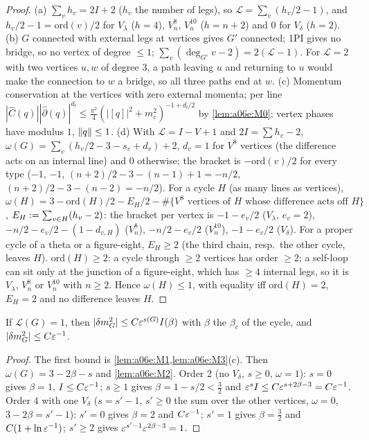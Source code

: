 \begin{proof}
(a) $\sum_vh_v=2I+2$ ($h_v$ the number of legs), so $\mathcal L=\sum_v(h_v/2-1)$, and $h_v/2-1=\mathrm{ord}(v)/2$ for $V_\lambda$ ($h=4$), $V^8_n$, $V^{10}_n$ ($h=n+2$) and $0$ for $V_\delta$ ($h=2$). (b) $G$ connected with external legs at vertices gives $G'$ connected; 1PI gives no bridge, so no vertex of degree $\le1$; $\sum_v(\deg_{G'}v-2)=2(\mathcal L-1)$. For $\mathcal L=2$ with two vertices $u,w$ of degree $3$, a path leaving $u$ and returning to $u$ would make the connection to $w$ a bridge, so all three paths end at $w$. (c) Momentum conservation at the vertices with zero external momenta; per line $|\hat C(q)||\hat\partial(q)|^{d_l}\le\frac{\pi^2}4(|[q]|^2+m_c^2)^{-1+d_l/2}$ by \cref{lem:a06e:M0}; vertex phases have modulus $1$, $\lVert q\rVert\le1$. (d) With $\mathcal L=I-V+1$ and $2I=\sum h_v-2$, $\omega(G)=\sum_v(h_v/2-3-s_v+d_v)+2$, $d_v=1$ for $V^8$ vertices (the difference acts on an internal line) and $0$ otherwise; the bracket is $-\mathrm{ord}(v)/2$ for every type ($-1$, $-1$, $(n+2)/2-3-(n-1)+1=-n/2$, $(n+2)/2-3-(n-2)=-n/2$). For a cycle $H$ (as many lines as vertices), $\omega(H)=3-\mathrm{ord}(H)/2-E_H/2-\#\{V^8\text{ vertices of }H\text{ whose difference acts off }H\}$, $E_H:=\sum_{v\in H}(h_v-2)$: the bracket per vertex is $-1-e_v/2$ ($V_\lambda$, $e_v=2$), $-n/2-e_v/2-(1-d_{v,H})$ ($V^8_n$), $-n/2-e_v/2$ ($V^{10}_n$), $-1-e_v/2$ ($V_\delta$). For a proper cycle of a theta or a figure-eight, $E_H\ge2$ (the third chain, resp.\ the other cycle, leaves $H$). $\mathrm{ord}(H)\ge2$: a cycle through $\ge2$ vertices has order $\ge2$; a self-loop can sit only at the junction of a figure-eight, which has $\ge4$ internal legs, so it is $V_\lambda$, $V^8_n$ or $V^{10}_n$ with $n\ge2$. Hence $\omega(H)\le1$, with equality iff $\mathrm{ord}(H)=2$, $E_H=2$ and no difference leaves $H$.
\end{proof}

\begin{lemma}\label{lem:a06e:M4}
If $\mathcal L(G)=1$, then $|\delta m^2_G|\le C\varepsilon^{s(G)}I(\beta)$ with $\beta$ the $\beta_c$ of the cycle, and $|\delta m^2_G|\le C\varepsilon^{-1}$.
\end{lemma}

\begin{proof}
The first bound is \cref{lem:a06e:M1,lem:a06e:M3}(c). Then $\omega(G)=3-2\beta-s$ and \cref{lem:a06e:M2}. Order $2$ (no $V_\delta$, $s\ge0$, $\omega=1$): $s=0$ gives $\beta=1$, $I\le C\varepsilon^{-1}$; $s\ge1$ gives $\beta=1-s/2<\frac32$ and $\varepsilon^sI\le C\varepsilon^{s+2\beta-3}=C\varepsilon^{-1}$. Order $4$ with one $V_\delta$ ($s=s'-1$, $s'\ge0$ the sum over the other vertices, $\omega=0$, $3-2\beta=s'-1$): $s'=0$ gives $\beta=2$ and $C\varepsilon^{-1}$; $s'=1$ gives $\beta=\frac32$ and $C(1+\ln\varepsilon^{-1})$; $s'\ge2$ gives $\varepsilon^{s'-1}\varepsilon^{2\beta-3}=1$.
\end{proof}

